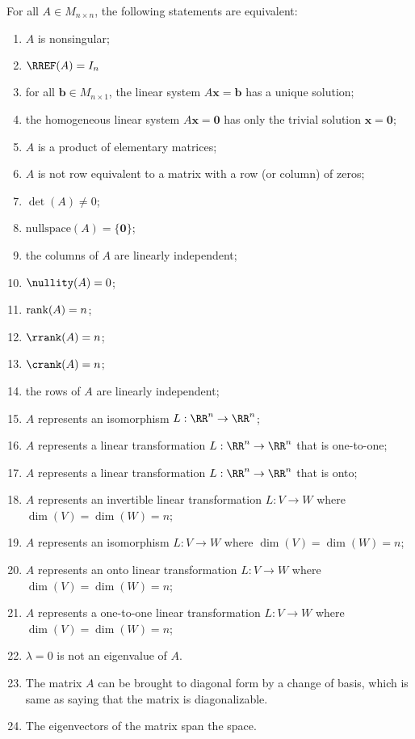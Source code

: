 \documentclass{book}
\theoremstyle{remark}
\theoremstyle{definition}
\begin{document}
\noindent For all $A \in M_{n\times n}$, the following statements are equivalent:
\begin{enumerate}
\item\label{nonsing} $A$ is nonsingular;
\item\label{identity} $\RREF(A) = I_n$
\item\label{unique solution} for all $\mathbf{b} \in M_{n\times 1}$, the linear system $A \mathbf{x} = \mathbf{b}$ has a unique solution;
\item\label{homogeneous} the homogeneous linear system $A \mathbf{x} = \mathbf{0}$ has only the trivial solution $\mathbf{x} = \mathbf{0}$;
\item\label{elementary} $A$ is a product of elementary matrices;
\item\label{no zero row} $A$ is not row equivalent to a matrix with a row (or column) of zeros;
\item\label{det nonzero} $\det(A) \not = 0$;
\item\label{null_space} $\mathrm{nullspace}(A) = \{\mathbf{0}\}$;
\item\label{cols A} the columns of $A$ are linearly independent;
\item\label{nullity A} $\nullity(A) = 0$;
\item\label{rank A} $\rank(A) = n$;
\item\label{row rank} $\rrank(A) = n$;
\item\label{col rank} $\crank(A) = n$;
\item\label{rows A} the rows of $A$ are linearly independent;
\item\label{isomorphism} $A$ represents an isomorphism $L:\RR^n \to \RR^n$;
\item\label{one-to-one} $A$ represents a linear transformation $L:\RR^n \to \RR^n$ that is one-to-one;
\item\label{onto} $A$ represents a linear transformation $L:\RR^n \to \RR^n$ that is onto;
\item \label{operator-invertible} $A$ represents an invertible linear transformation $L: V \to W$ where $\dim(V) = \dim(W) = n$;
\item \label{transf-iso} $A$ represents an isomorphism $L:V \to W$ where $\dim(V) = \dim(W) = n$;
\item \label{transf-onto} $A$ represents an onto linear transformation $L: V \to W$ where $\dim(V) = \dim(W) = n$;
\item \label{transf-one-to-one} $A$ represents a one-to-one linear transformation $L: V \to W$ where $\dim(V) = \dim(W) = n$;
\item \label{eigen} $\lambda = 0$ is not an eigenvalue of $A$.
\item The matrix $A$ can be brought to diagonal form by a change of basis, which is same as saying that the matrix is diagonalizable. 
\item The eigenvectors of the matrix span the space.  
\end{enumerate}
\end{document}
